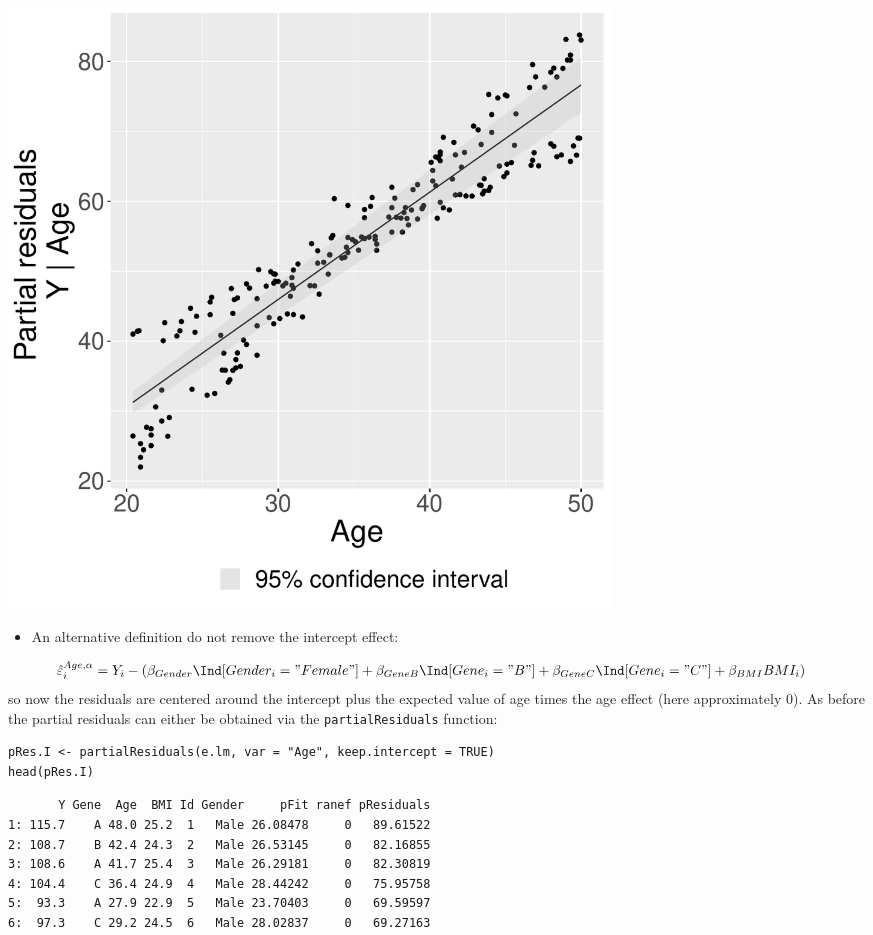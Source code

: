 \documentclass[12pt]{article}
\begin{document}
\begin{center}
\includegraphics[width=0.7\textwidth]{./figures/fig-butils-plotConf-noI.pdf}
\end{center}

\begin{itemize}
\item An alternative definition do not remove the intercept effect:
\end{itemize}
\begin{align*}
\hat{\varepsilon}^{Age,\alpha}_i &= Y_i - \left(\beta_{Gender} \Ind[Gender_i="Female"] + \beta_{GeneB} \Ind[Gene_i="B"] + \beta_{GeneC} \Ind[Gene_i="C"] + \beta_{BMI} BMI_i \right)
\end{align*}
so now the residuals are centered around the intercept plus the
expected value of age times the age effect (here approximately 0). As
before the partial residuals can either be obtained via the
\texttt{partialResiduals} function:
\lstset{language=r,label= ,caption= ,captionpos=b,numbers=none}
\begin{lstlisting}
pRes.I <- partialResiduals(e.lm, var = "Age", keep.intercept = TRUE)
head(pRes.I)
\end{lstlisting}

\begin{verbatim}
       Y Gene  Age  BMI Id Gender     pFit ranef pResiduals
1: 115.7    A 48.0 25.2  1   Male 26.08478     0   89.61522
2: 108.7    B 42.4 24.3  2   Male 26.53145     0   82.16855
3: 108.6    A 41.7 25.4  3   Male 26.29181     0   82.30819
4: 104.4    C 36.4 24.9  4   Male 28.44242     0   75.95758
5:  93.3    A 27.9 22.9  5   Male 23.70403     0   69.59597
6:  97.3    C 29.2 24.5  6   Male 28.02837     0   69.27163
\end{verbatim}
\end{document}
